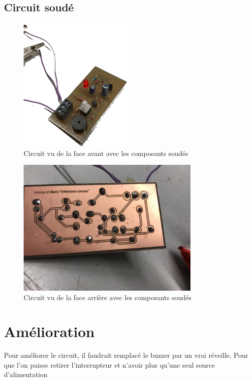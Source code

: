\section{Circuit soudé}

\begin{figure}[H]
\centering
\includegraphics[width=0.5\textwidth]{ressources/carteSouderC}
\caption{Circuit vu de la face avant avec les composants soudés}
\label{schemaBoard}
\end{figure}


\begin{figure}[H]
\centering
\includegraphics[width=0.8\textwidth]{ressources/soudure}
\caption{Circuit vu de la face arrière avec les composants soudés}
\label{schemaBoard}
\end{figure}



\chapter{Amélioration}

Pour améliorer le circuit, il faudrait remplacé le buzzer par un vrai réveille. Pour que l'on puisse retirer l'interrupteur et n'avoir plus qu'une seul source d'alimentation





